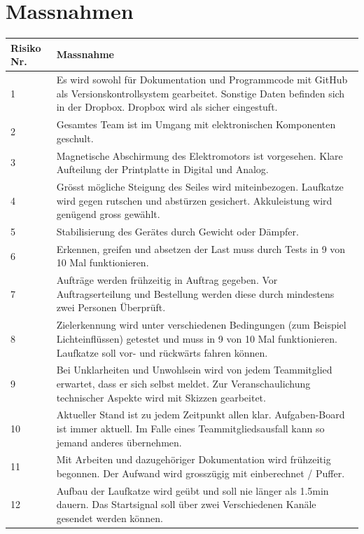 \documentclass[a4paper]{report}
\begin{document}
\section{Massnahmen}
\vspace{1em}
\noindent
\begin{tabular}{|p{}|p{}|}
	\hline
	\textbf{Risiko Nr.} & \textbf{Massnahme} \\
	\hline
	1 & Es wird sowohl für Dokumentation und Programmcode mit GitHub als Versionskontrollsystem gearbeitet. Sonstige Daten befinden sich in der Dropbox. Dropbox wird als sicher eingestuft. \\
	\hline
	2 & Gesamtes Team ist im Umgang mit elektronischen Komponenten geschult. \\
	\hline
	3 & Magnetische Abschirmung des Elektromotors ist vorgesehen. Klare Aufteilung der Printplatte in Digital und Analog. \\
	\hline
	4 & Grösst mögliche Steigung des Seiles wird miteinbezogen. Laufkatze wird gegen rutschen und abstürzen gesichert. Akkuleistung wird genügend gross gewählt. \\
	\hline
	5 & Stabilisierung des Gerätes durch Gewicht oder Dämpfer. \\
	\hline
	6 & Erkennen, greifen und absetzen der Last muss durch Tests in 9 von 10 Mal funktionieren. \\
	\hline
	7 & Aufträge werden frühzeitig in Auftrag gegeben. Vor Auftragserteilung und Bestellung werden diese durch mindestens zwei Personen Überprüft.\\
	\hline
	8 & Zielerkennung wird unter verschiedenen Bedingungen (zum Beispiel Lichteinflüssen) getestet und muss in 9 von 10 Mal funktionieren. Laufkatze soll vor- und rückwärts fahren können. \\
	\hline
	9 & Bei Unklarheiten und Unwohlsein wird von jedem Teammitglied erwartet, dass er sich selbst meldet. Zur Veranschaulichung technischer Aspekte wird mit Skizzen gearbeitet. \\
	\hline
	10 & Aktueller Stand ist zu jedem Zeitpunkt allen klar. Aufgaben-Board ist immer aktuell. Im Falle eines Teammitgliedsausfall kann so jemand anderes übernehmen. \\
	\hline
	11 & Mit Arbeiten und dazugehöriger Dokumentation wird frühzeitig begonnen. Der Aufwand wird grosszügig mit einberechnet / Puffer. \\
	\hline
	12 & Aufbau der Laufkatze wird geübt und soll nie länger als 1.5min dauern. Das Startsignal soll über zwei Verschiedenen Kanäle gesendet werden können. \\
	\hline
\end{tabular}
\end{document}
